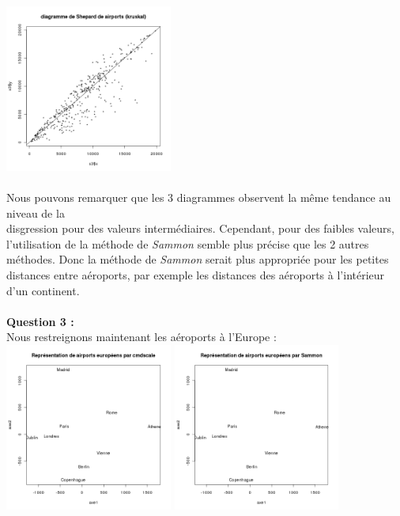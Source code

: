 \documentclass[a4paper, 10pt]{article}
\begin{document}
\includegraphics[height = 5.5cm, width = 5.5cm]{plots/plot_airports_shepard_kruskal.png}\\ \\
Nous pouvons remarquer que les 3 diagrammes observent la même tendance au niveau de la\\disgression pour des valeurs intermédiaires.
Cependant, pour des faibles valeurs, l'utilisation de la méthode de \textit{Sammon} semble plus précise que les 2 autres méthodes.
Donc la méthode de \textit{Sammon} serait plus appropriée pour les petites distances entre aéroports, par exemple les distances
des aéroports à l'intérieur d'un continent.\\ \\
\textbf{Question 3 :}\\
Nous restreignons maintenant les aéroports à l'Europe :\\
\includegraphics[height = 5.5cm, width = 5.5cm]{plots/plot_euro_cmdscale.png}
\includegraphics[height = 5.5cm, width = 5.5cm]{plots/plot_euro_sammon.png}
\end{document}
